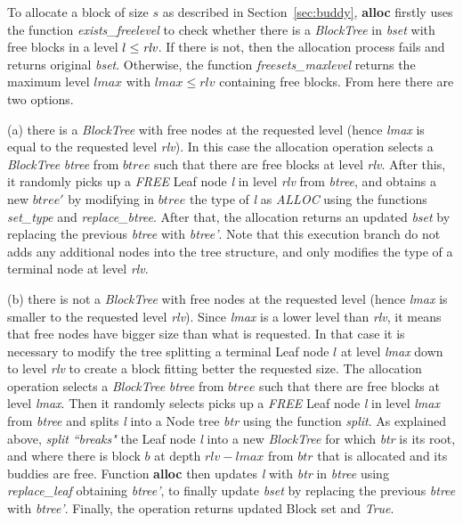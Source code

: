 To allocate a block of size $s$ as described in Section~\ref{sec:buddy}, \textbf{alloc} firstly uses the function \emph{exists\_freelevel} to check whether there is a \emph{BlockTree} in \emph{bset} with free blocks in a level $l \leq \emph{rlv}$. If there is not, then the allocation process fails and returns original \emph{bset}. Otherwise, the function \emph{freesets\_maxlevel} returns the maximum level $lmax$ with $lmax \leq rlv$ containing free blocks. From here there are two options. 

(a) there is a \emph{BlockTree} with free nodes at the requested level (hence \emph{lmax} is equal to the requested level \emph{rlv}). In this case the allocation operation selects a \emph{BlockTree} \emph{btree} from $btree$ such that there are free blocks at level \emph{rlv}. After this, it randomly picks up a \emph{FREE} Leaf node \emph{l} in level \emph{rlv} from \emph{btree}, and obtains a new $btree'$ by modifying in $btree$ the type of \emph{l} as \emph{ALLOC} using the functions \emph{set\_type} and \emph{replace\_btree}. After that, the allocation returns an updated \emph{bset} by replacing the previous \emph{btree} with \emph{btree'}. Note that this execution branch do not adds any additional nodes into the tree structure, and only modifies the type of a terminal node at level \emph{rlv}.

(b) there is not a \emph{BlockTree} with free nodes at the requested level (hence \emph{lmax} is smaller to the requested level \emph{rlv}). Since  \emph{lmax} is a lower level than \emph{rlv}, it means that free nodes have bigger size than what is requested. In that case it is necessary to modify the tree splitting a terminal Leaf node $l$ at level \emph{lmax} down to level \emph{rlv} to create a block fitting better the requested size. The allocation operation selects a \emph{BlockTree} \emph{btree} from $btree$ such that there are free blocks at level \emph{lmax}. Then it randomly selects picks up a \emph{FREE} Leaf node \emph{l} in level \emph{lmax} from \emph{btree} and splits \emph{l} into a Node tree \emph{btr} using the function \emph{split}. As explained above, \emph{split} \emph{``breaks"} the Leaf node \emph{l} into a new \emph{BlockTree} for which \emph{btr} is its root, and where there is block $b$ at depth $rlv - lmax$ from $btr$ that is allocated and its buddies are free. Function \textbf{alloc} then updates \emph{l} with \emph{btr} in \emph{btree} using \emph{replace\_leaf} obtaining \emph{btree'}, to finally update \emph{bset} by replacing the previous \emph{btree} with \emph{btree'}. Finally, the operation returns updated Block set and \emph{True}.

